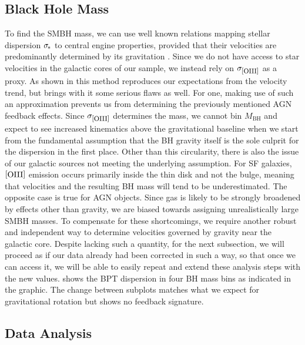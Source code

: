 	\subsection{Black Hole Mass}

	To find the SMBH mass, we can use well known relations mapping stellar dispersion $\sigma_{\kern-1pt *}$ to central engine properties,
	provided that their velocities are predominantly determined by its gravitation \cite{trem2002, gebh2000, wu2009}. Since we do not have
	access to star velocities in the galactic cores of our sample, we instead rely on
	$\sigma_{\mathrm{\raisebox{0.5pt}{\footnotesize[\raisebox{-0.5pt}{\footnotesize{OIII}}]}}}$ as a proxy. As shown in
	 this method reproduces our expectations from the velocity trend, but brings with it some serious flaws as well. For one,
	making use of such an approximation prevents us from determining the previously mentioned AGN feedback effects. Since 
	$\sigma_{\mathrm{\raisebox{0.5pt}{\footnotesize[\raisebox{-0.5pt}{\footnotesize{OIII}}]}}}$ determines the mass, we cannot bin $M_\mathrm{BH}$
	and expect to see increased kinematics above the gravitational baseline when we start from the fundamental assumption that the BH gravity itself
	is the sole culprit for the dispersion in the first place. Other than this circularity, there is also the issue of our galactic sources
	not meeting the underlying assumption. For SF galaxies, $\mathrm{\raisebox{0.75pt}{[\raisebox{-0.75pt}{OIII}]}}$ emission occurs primarily
	inside the thin disk and not the bulge, meaning that velocities and the resulting BH mass will tend to be underestimated. The opposite case
	is true for AGN objects. Since gas is likely to be strongly broadened by effects other than gravity, we are biased towards assigning unrealistically
	large SMBH masses. To compensate for these shortcomings, we require another robust and independent way to determine velocities governed by gravity
	near the galactic core. Despite lacking such a quantity, for the next subsection, we will proceed as if our data already had been corrected in such
	a way, so that once we can access it, we will be able to easily repeat and extend these analysis steps with the new values. 
	shows the BPT dispersion in four BH mass bins as indicated in the graphic. The change between subplots matches what we expect for gravitational
	rotation but shows no feedback signature.

	\subsection{Data Analysis}

